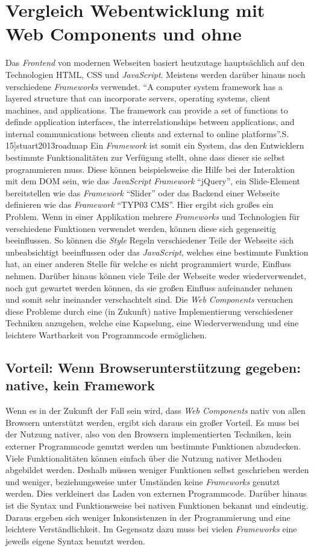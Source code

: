 \documentclass[12pt, paper=a4, bibtotoc, toc=listof, headsepline=true]{scrreprt}
\renewcommand{\smfootcite}[2][2]{\relax}
\begin{document}
		\section{Vergleich Webentwicklung mit Web Components und ohne}
			Das \emph{Frontend} von modernen Webseiten basiert heutzutage hauptsächlich auf den Technologien \ac{HTML}, \ac{CSS} und \emph{JavaScript}. Meistens werden darüber hinaus noch verschiedene \emph{Frameworks} verwendet. \enquote{A computer system framework has a layered structure that can incorporate servers, operating systems, client machines, and applications. The framework can provide a set of functions to definde application interfaces, the interrelationships between applications, and internal communications between clients and external to online platforms}.\smfootcite[][S. 15]{stuart2013roadmap} Ein \emph{Framework} ist somit ein System, das den Entwicklern bestimmte Funktionalitäten zur Verfügung stellt, ohne dass dieser sie selbst programmieren muss. Diese können beispielsweise die Hilfe bei der Interaktion mit dem \ac{DOM} sein, wie das \emph{JavaScript Framework} \enquote{jQuery}, ein Slide-Element bereitstellen wie das \emph{Framework} \enquote{Slider} oder das Backend einer Webseite definieren wie das \emph{Framework} \enquote{TYP03 CMS}. Hier ergibt sich großes ein Problem. Wenn in einer Applikation mehrere \emph{Frameworks} und Technologien für verschiedene Funktionen verwendet werden, können diese sich gegenseitig beeinflussen. So können die \emph{Style} Regeln verschiedener Teile der Webseite sich unbeabsichtigt beeinflussen oder das \emph{JavaScript}, welches eine bestimmte Funktion hat, an einer anderen Stelle für welche es nicht programmiert wurde, Einfluss nehmen. Darüber hinaus können viele Teile der Webseite weder wiederverwendet, noch gut gewartet werden können, da sie großen Einfluss aufeinander nehmen und somit sehr ineinander verschachtelt sind.
			Die \emph{Web Components} versuchen diese Probleme durch eine (in Zukunft) native Implementierung verschiedener Techniken anzugehen, welche eine Kapselung, eine Wiederverwendung und eine leichtere Wartbarkeit von Programmcode ermöglichen.			
			\subsection{Vorteil: Wenn Browserunterstützung gegeben: native, kein Framework}
			Wenn es in der Zukunft der Fall sein wird, dass \emph{Web Components} nativ von allen Browsern unterstützt werden, ergibt sich daraus ein großer Vorteil. Es muss bei der Nutzung nativer, also von den Browsern implementierten Techniken, kein externer Programmcode genutzt werden um bestimmte Funktionen abzudecken. Viele Funktionalitäten können einfach über die Nutzung nativer Methoden abgebildet werden. Deshalb müssen weniger Funktionen selbst geschrieben werden und weniger, beziehungsweise unter Umständen keine \emph{Frameworks} genutzt werden. Dies verkleinert das Laden von externen Programmcode. Darüber hinaus ist die Syntax und Funktionsweise bei nativen Funktionen bekannt und eindeutig. Daraus ergeben sich weniger Inkonsistenzen in der Programmierung und eine leichtere Verständlichkeit. Im Gegensatz dazu muss bei vielen \emph{Frameworks} eine jeweils eigene Syntax benutzt werden.
\end{document}
